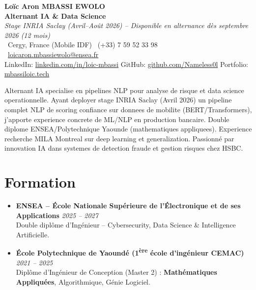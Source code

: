 \documentclass[a4paper,11pt]{article}
\begin{document}
\begin{center}
    {\Large \textbf{Lo\"ic Aron MBASSI EWOLO}} \\ \vspace{4pt}
    \textbf{\large Alternant IA \& Data Science} \\
    \textit{\small Stage INRIA Saclay (Avril--Ao\^ut 2026) -- Disponible en alternance d\`es septembre 2026 (12 mois)} \\ \vspace{4pt}
    \small
    \Pointinghand\ Cergy, France (Mobile IDF) \quad
    \Mobilefone\ (+33) 7 59 52 33 98 \quad
    {\color{primary}\Letter\ \href{mailto:loicaron.mbassiewolo@ensea.fr}{loicaron.mbassiewolo@ensea.fr}} \\ \vspace{2pt}
    {\color{primary}LinkedIn: \href{https://www.linkedin.com/in/loic-mbassi/}{linkedin.com/in/loic-mbassi}} \quad
    {\color{primary}GitHub: \href{https://github.com/Nameless0l}{github.com/Nameless0l}} \quad
    {\color{primary}Portfolio: \href{https://mbassiloic.tech}{mbassiloic.tech}}
\end{center}
\vspace{-6pt}
\noindent\small{Alternant IA specialise en pipelines NLP pour analyse de risque et data science operationnelle. Ayant deployer stage INRIA Saclay (Avril 2026) un pipeline complet NLP de scoring confiance sur donnees de mobilite (BERT/Transformers), j'apporte experience concrete de ML/NLP en production bancaire. Double diplome ENSEA/Polytechnique Yaounde (mathematiques appliquees). Experience recherche MILA Montreal sur deep learning et generalization. Passionné par innovation IA dans systemes de detection fraude et gestion risques chez HSBC.}

\section{Formation}
\begin{itemize}[leftmargin=*, label=\tiny$\bullet$, nosep]
    \item \textbf{ENSEA -- \'Ecole Nationale Sup\'erieure de l'\'Electronique et de ses Applications} \hfill \textit{2025 -- 2027} \\
    \small{Double dipl\^ome d'Ing\'enieur -- Cybersecurity, Data Science \& Intelligence Artificielle.}
    \item \textbf{\'Ecole Polytechnique de Yaound\'e (1\textsuperscript{\`ere} \'ecole d'ing\'enieur CEMAC)} \hfill \textit{2021 -- 2025} \\
    \small{Dipl\^ome d'Ing\'enieur de Conception (Master 2) : \textbf{Math\'ematiques Appliqu\'ees}, Algorithmique, G\'enie Logiciel.}
\end{itemize}
\end{document}
